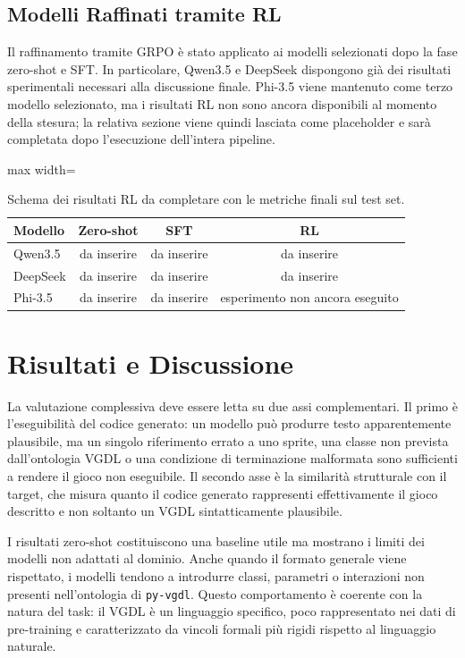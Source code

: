 \documentclass[final,5p,times,twocolumn]{elsarticle}
\begin{document}
\subsection{Modelli Raffinati tramite RL}

Il raffinamento tramite GRPO \`e stato applicato ai modelli selezionati dopo la fase zero-shot e SFT. In particolare, Qwen3.5 e DeepSeek dispongono gi\`a dei risultati sperimentali necessari alla discussione finale. Phi-3.5 viene mantenuto come terzo modello selezionato, ma i risultati RL non sono ancora disponibili al momento della stesura; la relativa sezione viene quindi lasciata come placeholder e sar\`a completata dopo l'esecuzione dell'intera pipeline.

\begin{table}[h]
\centering
\caption{Schema dei risultati RL da completare con le metriche finali sul test set.}
\label{tab:rl_results_placeholder}
\begin{adjustbox}{max width=\columnwidth}
\begin{tabular}{lccc}
\toprule
Modello & Zero-shot & SFT & RL \\
\midrule
Qwen3.5 & da inserire & da inserire & da inserire \\
DeepSeek & da inserire & da inserire & da inserire \\
Phi-3.5 & da inserire & da inserire & esperimento non ancora eseguito \\
\bottomrule
\end{tabular}
\end{adjustbox}
\end{table}

\section{Risultati e Discussione}

La valutazione complessiva deve essere letta su due assi complementari. Il primo \`e l'eseguibilit\`a del codice generato: un modello pu\`o produrre testo apparentemente plausibile, ma un singolo riferimento errato a uno sprite, una classe non prevista dall'ontologia VGDL o una condizione di terminazione malformata sono sufficienti a rendere il gioco non eseguibile. Il secondo asse \`e la similarit\`a strutturale con il target, che misura quanto il codice generato rappresenti effettivamente il gioco descritto e non soltanto un VGDL sintatticamente plausibile.

I risultati zero-shot costituiscono una baseline utile ma mostrano i limiti dei modelli non adattati al dominio. Anche quando il formato generale viene rispettato, i modelli tendono a introdurre classi, parametri o interazioni non presenti nell'ontologia di \texttt{py-vgdl}. Questo comportamento \`e coerente con la natura del task: il VGDL \`e un linguaggio specifico, poco rappresentato nei dati di pre-training e caratterizzato da vincoli formali pi\`u rigidi rispetto al linguaggio naturale.
\end{document}
